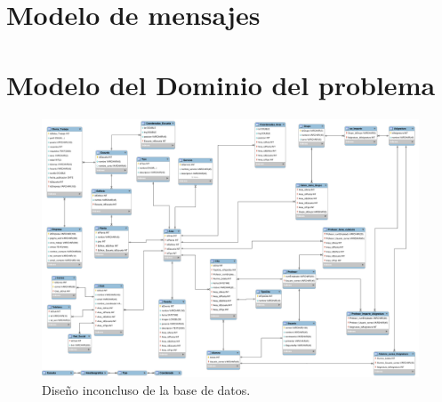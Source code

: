 \documentclass[oneside,10pt]{book}
\begin{document}
\chapter{Modelo de mensajes}


\chapter{Modelo del Dominio del problema}

	\begin{figure}[htbp!]
		\centering
			\includegraphics[width=1\textwidth]{images/baseDeDatos}
		\caption{Diseño inconcluso de la base de datos.}
	\end{figure}



\end{document}
